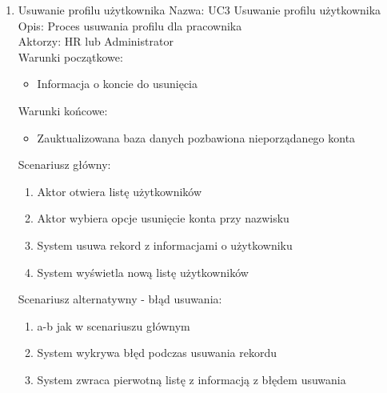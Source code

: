 \begin{enumerate}
\item Usuwanie profilu użytkownika
Nazwa: UC3 Usuwanie profilu użytkownika \\
Opis: Proces usuwania profilu dla pracownika \\
Aktorzy: HR lub Administrator \\
Warunki początkowe:
\begin{itemize}
\item Informacja o koncie do usunięcia
\end{itemize}
Warunki końcowe: 
\begin{itemize}
\item Zauktualizowana baza danych pozbawiona nieporządanego konta
\end{itemize}
Scenariusz główny:
\begin{enumerate}
\item Aktor otwiera listę użytkowników
\item Aktor wybiera opcje usunięcie konta przy nazwisku
\item System usuwa rekord z informacjami o użytkowniku
\item System wyświetla nową listę użytkowników
\end{enumerate}
Scenariusz alternatywny - błąd usuwania: 
\begin{enumerate}
\item a-b jak w scenariuszu głównym
\item System wykrywa błęd podczas usuwania rekordu
\item System zwraca pierwotną listę z informacją z błędem usuwania
\end{enumerate}


\end{enumerate}
